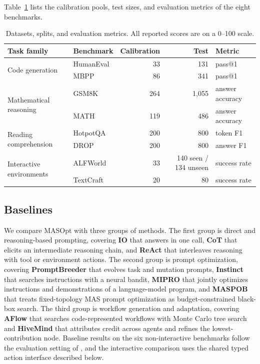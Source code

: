 \documentclass{article}
\theoremstyle{definition}
\begin{document}
Table~\ref{tab:data-splits} lists the calibration pools, test sizes, and evaluation metrics of the eight benchmarks.

\begin{table}[!htbp]
    \centering
    \caption{Datasets, splits, and evaluation metrics. All reported scores are on a 0--100 scale.}
    \label{tab:data-splits}
    \small
    \setlength{\tabcolsep}{8pt}
    \begin{tabular}{@{}llrrl@{}}
        \toprule
        \textbf{Task family} & \textbf{Benchmark} & \textbf{Calibration} & \textbf{Test} & \textbf{Metric} \\
        \midrule
        \multirow{2}{*}{Code generation} & HumanEval & 33 & 131 & pass@1 \\
                        & MBPP & 86 & 341 & pass@1 \\
        \multirow{2}{*}{Mathematical reasoning} & GSM8K & 264 & 1,055 & answer accuracy \\
                               & MATH & 119 & 486 & answer accuracy \\
        \multirow{2}{*}{Reading comprehension} & HotpotQA & 200 & 800 & token F1 \\
                              & DROP & 200 & 800 & answer F1 \\
        \multirow{2}{*}{Interactive environments} & ALFWorld & 33 & 140 seen / 134 unseen & success rate \\
                                 & TextCraft & 20 & 80 & success rate \\
        \bottomrule
    \end{tabular}
\end{table}

\subsection{Baselines}
\label{app:protocols}

We compare MASOpt with three groups of methods. The first group is direct and reasoning-based prompting, covering \textbf{IO} that answers in one call, \textbf{CoT} \citep{wei2022cot} that elicits an intermediate reasoning chain, and \textbf{ReAct} \citep{yao2023react} that interleaves reasoning with tool or environment actions. The second group is prompt optimization, covering \textbf{PromptBreeder} \citep{fernando2024promptbreeder} that evolves task and mutation prompts, \textbf{Instinct} \citep{lin2023instinct} that searches instructions with a neural bandit, \textbf{MIPRO} \citep{opsahlong2024mipro} that jointly optimizes instructions and demonstrations of a language-model program, and \textbf{MASPOB} \citep{hong2026maspob} that treats fixed-topology MAS prompt optimization as budget-constrained black-box search. The third group is workflow generation and adaptation, covering \textbf{AFlow} \citep{zhang2024aflow} that searches code-represented workflows with Monte Carlo tree search and \textbf{HiveMind} \citep{xia2025hivemind} that attributes credit across agents and refines the lowest-contribution node. Baseline results on the six non-interactive benchmarks follow the evaluation setting of \citet{hong2026maspob}, and the interactive comparison uses the shared typed action interface described below.
\end{document}
